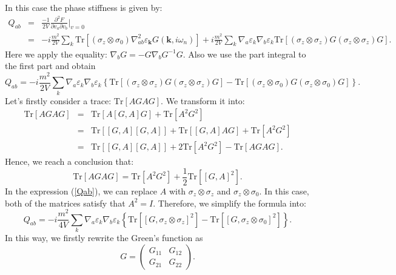 \documentclass[aps,superscriptaddress,notitlepage,longbibliography]{revtex4-1}
\begin{document}
In this case the phase stiffness is given by: 
\begin{eqnarray}
Q_{ab} & = & \frac{-1}{2V}\frac{\partial^{2}F}{\partial v_{a}\partial v_{b}}|_{v=0}\nonumber \\
 & = & -i\frac{m^{2}}{2V}\sum_{k}\text{Tr}[(\sigma_{z}\otimes\sigma_{0})\nabla_{ab}^{2}\varepsilon_{\bm{k}}G(\bm{k},i\omega_{n})]+i\frac{m^{2}}{2V}\sum_{k}\nabla_{a}\varepsilon_{k}\nabla_{b}\varepsilon_{k}\text{Tr}[(\sigma_{z}\otimes\sigma_{z})G(\sigma_{z}\otimes\sigma_{z})G].
\end{eqnarray}
Here we apply the equality: $\nabla_{b}G=-G\nabla_{b}G^{-1}G$. Also
we use the part integral to the first part and obtain 
\begin{equation}
Q_{ab}=-i\frac{m^{2}}{2V}\sum_{k}\nabla_{a}\varepsilon_{k}\nabla_{b}\varepsilon_{k}\left\{ \text{Tr}[(\sigma_{z}\otimes\sigma_{z})G(\sigma_{z}\otimes\sigma_{z})G]-\text{Tr}[(\sigma_{z}\otimes\sigma_{0})G(\sigma_{z}\otimes\sigma_{0})G]\right\} .\label{Qab}
\end{equation}
Let's firstly consider a trace: $\text{Tr}[AGAG]$. We transform it
into: 
\begin{eqnarray}
\text{Tr}[AGAG] & = & \text{Tr}[A[G,A]G]+\text{Tr}[A^{2}G^{2}]\nonumber \\
 & = & \text{Tr}[[G,A][G,A]]+\text{Tr}[[G,A]AG]+\text{Tr}[A^{2}G^{2}]\nonumber \\
 & = & \text{Tr}[[G,A][G,A]]+2\text{Tr}[A^{2}G^{2}]-\text{Tr}[AGAG].
\end{eqnarray}
Hence, we reach a conclusion that: 
\begin{equation}
\text{Tr}[AGAG]=\text{Tr}[A^{2}G^{2}]+\frac{1}{2}\text{Tr}[[G,A]^{2}].
\end{equation}
In the expression (\ref{Qab}), we can replace $A$ with $\sigma_{z}\otimes\sigma_{z}$
and $\sigma_{z}\otimes\sigma_{0}$. In this case, both of the matrices
satisfy that $A^{2}=I$. Therefore, we simplify the formula into:
\begin{equation}
Q_{ab}=-i\frac{m^{2}}{4V}\sum_{k}\nabla_{a}\varepsilon_{k}\nabla_{b}\varepsilon_{k}\left\{ \text{Tr}[[G,\sigma_{z}\otimes\sigma_{z}]^{2}]-\text{Tr}[[G,\sigma_{z}\otimes\sigma_{0}]^{2}]\right\} .\label{Qab2}
\end{equation}
In this way, we firstly rewrite the Green's function as 
\begin{equation}
G=\left(\begin{array}{cc}
G_{11} & G_{12}\\
G_{21} & G_{22}
\end{array}\right).
\end{equation}
\end{document}
